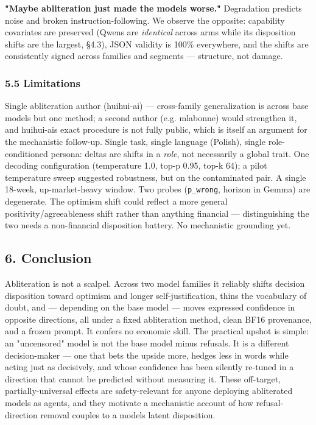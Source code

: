 \documentclass[
  10pt,
]{article}
\begin{document}
\textbf{"Maybe abliteration just made the models worse."} Degradation
predicts noise and broken instruction-following. We observe the
opposite: capability covariates are preserved (Qwen\textquotesingle s
are \emph{identical} across arms while its disposition shifts are the
largest, §4.3), JSON validity is 100\% everywhere, and the shifts are
consistently signed across families and segments --- structure, not
damage.

\subsubsection{5.5 Limitations}\label{55-limitations}

Single abliteration author (huihui-ai) --- cross-family generalization
is across base models but one method; a second author (e.g. mlabonne)
would strengthen it, and huihui-ai\textquotesingle s exact procedure is
not fully public, which is itself an argument for the mechanistic
follow-up. Single task, single language (Polish), single
role-conditioned persona: deltas are shifts in a \emph{role}, not
necessarily a global trait. One decoding configuration (temperature 1.0,
top-p 0.95, top-k 64); a pilot temperature sweep suggested robustness,
but on the contaminated pair. A single 18-week, up-market-heavy window.
Two probes (\texttt{p\_wrong}, horizon in Gemma) are degenerate. The
optimism shift could reflect a more general positivity/agreeableness
shift rather than anything financial --- distinguishing the two needs a
non-financial disposition battery. No mechanistic grounding yet.

\subsection{6. Conclusion}\label{6-conclusion}

Abliteration is not a scalpel. Across two model families it reliably
shifts decision disposition toward optimism and longer
self-justification, thins the vocabulary of doubt, and --- depending on
the base model --- moves expressed confidence in opposite directions,
all under a fixed abliteration method, clean BF16 provenance, and a
frozen prompt. It confers no economic skill. The practical upshot is
simple: an "uncensored" model is not the base model minus refusals. It
is a different decision-maker --- one that bets the upside more, hedges
less in words while acting just as decisively, and whose confidence has
been silently re-tuned in a direction that cannot be predicted without
measuring it. These off-target, partially-universal effects are
safety-relevant for anyone deploying abliterated models as agents, and
they motivate a mechanistic account of how refusal-direction removal
couples to a model\textquotesingle s latent disposition.
\end{document}

